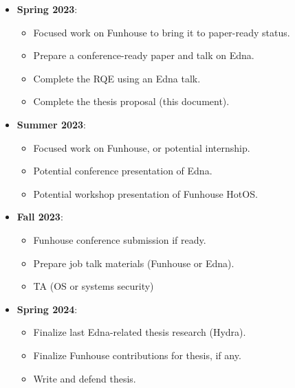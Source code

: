 \begin{itemize}
\item \textbf{Spring 2023}: 
    \begin{itemize}
        \item Focused work on Funhouse to bring it to paper-ready status.
        \item Prepare a conference-ready paper and talk on Edna.
        \item Complete the RQE using an Edna talk.
        \item Complete the thesis proposal (this document).
    \end{itemize}
\item \textbf{Summer 2023}: 
    \begin{itemize}
        \item Focused work on Funhouse, or potential internship.
        \item Potential conference presentation of Edna.
        \item Potential workshop presentation of Funhouse HotOS.
    \end{itemize}
\item \textbf{Fall 2023}: 
    \begin{itemize}
        \item Funhouse conference submission if ready.
        \item Prepare job talk materials (Funhouse or Edna).
        \item TA (OS or systems security)
    \end{itemize}
\item \textbf{Spring 2024}: 
    \begin{itemize}
        \item Finalize last Edna-related thesis research (Hydra).
        \item Finalize Funhouse contributions for thesis, if any.
        \item Write and defend thesis.
    \end{itemize}
\end{itemize}
